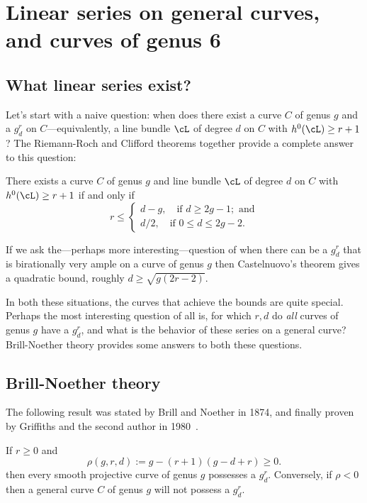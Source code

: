 

\chapter{Linear series on general curves, and curves of genus 6}\label{Brill-Noether}\label{BNChapter}

\section{What linear series exist?}

Let's start with a naive question: when does there exist a curve $C$ of genus $g$ and a $g^r_d$ on $C$---equivalently, a line bundle $\cL$ of degree $d$ on $C$ with $h^0(\cL) \geq r+1$? The Riemann-Roch and Clifford theorems together provide a complete answer to this question:

\begin{theorem}\label{arbitrary linear series}
There exists a curve $C$ of genus $g$ and line bundle $\cL$ of degree $d$ on $C$ with $h^0(\cL) \geq r+1$ if and only if
$$
r \leq
\begin{cases}
d-g, \quad \text{if } d \geq 2g-1; \text{ and} \\
d/2,  \quad \text{if } 0 \leq d \leq 2g-2.
\end{cases}
$$
\end{theorem}


If we ask the---perhaps more interesting---question of when there can be a $g^r_d$ that is birationally
very ample on a curve of genus $g$ then Castelnuovo's theorem gives a quadratic bound, roughly $d \geq \sqrt{g(2r-2)}$.

In both these situations, the curves that achieve the bounds are quite special. Perhaps the most interesting question of all is, for which $r,d$ do \emph{all} curves of genus $g$ have a $g^r_d$, and what is the
behavior of these series on a general curve? Brill-Noether theory provides some answers to both these questions.

\section{Brill-Noether theory}

The following result was stated by Brill and Noether in 1874, and finally proven by
Griffiths and the second author in 1980~\cite{Griffiths-Harris-BN}.

\begin{theorem}\label{basic BN}
If $r\geq 0$ and
 $$
 \rho(g,r,d) := g - (r+1)(g-d+r) \geq 0.
$$
then every smooth projective curve of genus $g$  possesses a $g^r_d$. Conversely, if $\rho < 0$ then a general curve $C$ of genus $g$ will not possess a $g^r_d$.
\end{theorem}

